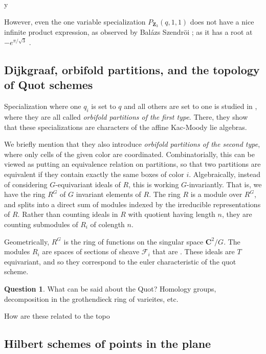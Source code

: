 y\documentclass{amsart}[12pt]
\theoremstyle{definition}
\newtheorem{question}{Question}
\newcommand{\Z}{\mathbf{Z}}
\newcommand{\C}{\mathbf{C}}
\begin{document}
However, even the one variable specialization $P_{\Z_3}(q,1,1)$ does not have a nice infinite product expression, as observed by Bal\'azs Szendr\"oi \cite{Bmo}; as it has a root at $-e^{\pi/\sqrt{3}}$ \cite{Borwein2}.

\subsection{Dijkgraaf, orbifold partitions, and the topology of Quot schemes}

Specialization where one $q_i$ is set to $q$ and all others are set to one is studied in \cite{DS}, where they are all called \emph{orbifold partitions of the first type}.  There, they show that these specializations are characters of the affine Kac-Moody lie algebras.

We briefly mention that they also introduce \emph{orbifold partitions of the second type}, where only cells of the given color are coordinated.  Combinatorially, this can be viewed as putting an equivalence relation on partitions, so that two partitions are equivalent if they contain exactly the same boxes of color $i$.  Algebraically, instead of considering $G$-equivariant ideals of $R$, this is working $G$-invariantly.  That is, we have the ring $R^G$ of $G$ invariant elements of $R$.  The ring $R$ is a module over $R^G$, and splits into a direct sum of modules indexed by the irreducible representations of $R$.  Rather than counting ideals in $R$ with quotient having length $n$, they are counting submodules of $R_i$ of colength $n$.  

Geometrically, $R^G$ is the ring of functions on the singular space $\C^2/G$.  The modules $R_i$ are spaces of sections of sheave $\mathcal{F}_i$ that are .  These ideals are $T$ equivariant, and so they correspond to the euler characteristic of the quot scheme.  


\begin{question}
What can be said about the Quot?  Homology groups, decomposition in the grothendieck ring of varieites, etc.

How are these related to the topo

\end{question}



\subsection{Hilbert schemes of points in the plane}
\end{document}
